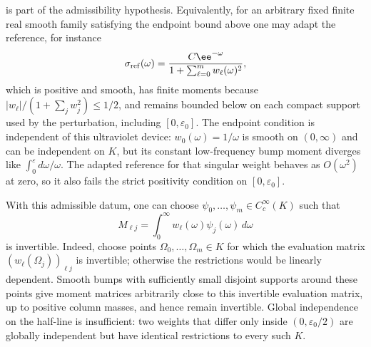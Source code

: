 is part of the admissibility hypothesis.  Equivalently, for an arbitrary fixed
finite real smooth family satisfying the endpoint bound above one may adapt
the reference, for instance
\[
  \sigma_{\rm ref}(\omega)
  =
  \frac{C\ee^{-\omega}}
       {1+\sum_{\ell=0}^m w_\ell(\omega)^2},
\]
which is positive and smooth, has finite moments because
\(|w_\ell|/(1+\sum_j w_j^2)\le 1/2\), and remains bounded below on each compact
support used by the perturbation, including \([0,\varepsilon_0]\).  The
endpoint condition is independent of this ultraviolet device:
\(w_0(\omega)=1/\omega\) is smooth on \((0,\infty)\) and can be independent on
\(K\), but its constant low-frequency bump moment diverges like
\(\int_0^\varepsilon d\omega/\omega\).  The adapted reference for that
singular weight behaves as \(O(\omega^2)\) at zero, so it also fails the
strict positivity condition on \([0,\varepsilon_0]\).

With this admissible datum, one can choose
\(\psi_0,\ldots,\psi_m\in C_c^\infty(K)\) such that
\[
  M_{\ell j}=\int_0^\infty w_\ell(\omega)\psi_j(\omega)\,d\omega
\]
is invertible.  Indeed, choose points
\(\Omega_0,\ldots,\Omega_m\in K\) for which the evaluation matrix
\((w_\ell(\Omega_j))_{\ell j}\) is invertible; otherwise the restrictions
would be linearly dependent.  Smooth bumps with sufficiently small disjoint
supports around these points give moment matrices arbitrarily close to this
invertible evaluation matrix, up to positive column masses, and hence remain
invertible.  Global independence on the half-line is insufficient:
two weights that differ only inside \((0,\varepsilon_0/2)\) are globally
independent but have identical restrictions to every such \(K\).

